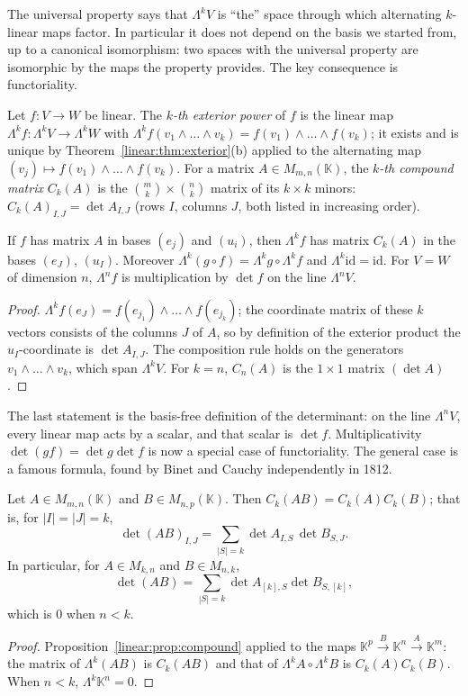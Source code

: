 The universal property says that $\Lambda^kV$ is ``the'' space through which alternating $k$-linear maps factor. In
particular it does not depend on the basis we started from, up to a canonical isomorphism: two spaces with the universal
property are isomorphic by the maps the property provides. The key consequence is functoriality.

\begin{definition}\label{linear:def:compound}
Let $f:V\to W$ be linear. The \emph{$k$-th exterior power} of $f$ is the linear map $\Lambda^kf:\Lambda^kV\to\Lambda^kW$
with $\Lambda^kf(v_1\wedge\dots\wedge v_k)=f(v_1)\wedge\dots\wedge f(v_k)$; it exists and is unique by
Theorem~\ref{linear:thm:exterior}(b) applied to the alternating map $(v_j)\mapsto f(v_1)\wedge\dots\wedge f(v_k)$. For a matrix
$A\in M_{m,n}(\mathbb K)$, the \emph{$k$-th compound matrix} $C_k(A)$ is the $\binom mk\times\binom nk$ matrix of its
$k\times k$ minors: $C_k(A)_{I,J}=\det A_{I,J}$ (rows $I$, columns $J$, both listed in increasing order).
\end{definition}

\begin{proposition}\label{linear:prop:compound}
If $f$ has matrix $A$ in bases $(e_j)$ and $(u_i)$, then $\Lambda^kf$ has matrix $C_k(A)$ in the bases $(e_J)$, $(u_I)$.
Moreover $\Lambda^k(g\circ f)=\Lambda^kg\circ\Lambda^kf$ and $\Lambda^k\mathrm{id}=\mathrm{id}$. For $V=W$ of dimension $n$,
$\Lambda^nf$ is multiplication by $\det f$ on the line $\Lambda^nV$.
\end{proposition}
\begin{proof}
$\Lambda^kf(e_J)=f(e_{j_1})\wedge\dots\wedge f(e_{j_k})$; the coordinate matrix of these $k$ vectors consists of the columns
$J$ of $A$, so by definition of the exterior product the $u_I$-coordinate is $\det A_{I,J}$. The composition rule holds on
the generators $v_1\wedge\dots\wedge v_k$, which span $\Lambda^kV$. For $k=n$, $C_n(A)$ is the $1\times1$ matrix $(\det A)$.
\end{proof}

The last statement is the basis-free definition of the determinant: on the line $\Lambda^nV$, every linear map acts by a
scalar, and that scalar is $\det f$. Multiplicativity $\det(gf)=\det g\det f$ is now a special case of functoriality.
The general case is a famous formula, found by Binet and Cauchy independently in 1812.

\begin{theorem}\label{linear:thm:cauchybinet}
Let $A\in M_{m,n}(\mathbb K)$ and $B\in M_{n,p}(\mathbb K)$. Then $C_k(AB)=C_k(A)C_k(B)$; that is, for $|I|=|J|=k$,
\[
\det(AB)_{I,J}=\sum_{|S|=k}\det A_{I,S}\,\det B_{S,J}.
\]
In particular, for $A\in M_{k,n}$ and $B\in M_{n,k}$,
\[
\det(AB)=\sum_{|S|=k}\det A_{[k],S}\det B_{S,[k]},
\]
which is $0$ when $n<k$.
\end{theorem}
\begin{proof}
Proposition~\ref{linear:prop:compound} applied to the maps $\mathbb K^p\xrightarrow{B}\mathbb K^n\xrightarrow{A}\mathbb K^m$:
the matrix of $\Lambda^k(AB)$ is $C_k(AB)$ and that of $\Lambda^kA\circ\Lambda^kB$ is $C_k(A)C_k(B)$. When $n<k$, $\Lambda^k\mathbb K^n=0$.
\end{proof}

